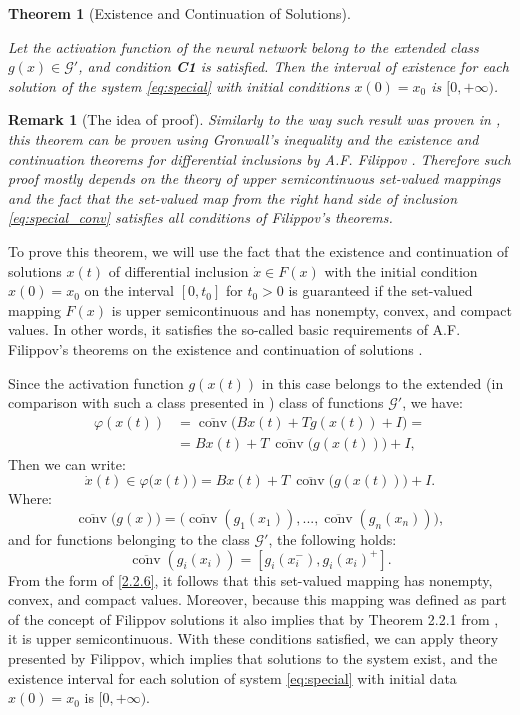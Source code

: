 \documentclass[journal]{IEEEtran}
\newtheorem{theorem}{Theorem}
\newtheorem{remark}{Remark}
\begin{document}
\begin{theorem}[Existence and Continuation of Solutions]\label{max_int}

Let the activation function of the neural network belong to the extended class $g(x)\in \mathcal{G'}$, and condition \textbf{C1} is satisfied. Then the interval of existence for each solution of the system \eqref{eq:special} with initial conditions $x(0) = x_0$ is $[0, +\infty)$.

\end{theorem}

\begin{remark} [The idea of proof]
Similarly to the way such result was proven in \cite{eq_ref_11, GAS_of_delayed, GAS_discrete_time_varying}, this theorem can be proven using Gronwall’s inequality and the existence and continuation theorems for differential inclusions by A.F. Filippov \cite{p2}. Therefore such proof mostly depends on the theory of upper semicontinuous set-valued mappings and the fact that the set-valued map from the right hand side of inclusion \eqref{eq:special_conv} satisfies all conditions of Filippov's theorems.
\end{remark}
\begin{IEEEproof}
To prove this theorem, we will use the fact that the existence and continuation of solutions \( x(t) \) of differential inclusion \( \dot{x} \in F(x) \) with the initial condition \( x(0) = x_0 \) on the interval \([0, t_0]\) for \( t_0 > 0 \) is guaranteed if the set-valued mapping \( F(x) \) is upper semicontinuous and has nonempty, convex, and compact values. In other words, it satisfies the so-called basic requirements of A.F. Filippov's theorems on the existence and continuation of solutions \cite[Theorems 1 and 2, pp. 77-78]{p2}. 

Since the activation function $g(x(t))$ in this case belongs to the extended (in comparison with such a class presented in \cite{p1}) class of functions
$\mathcal{G'}$, we have:
\[
\begin{aligned}
    \varphi(x(t)) &= \overline{\operatorname{conv}}\big(Bx(t) + T g(x(t)) + I\big) = \\
    &= Bx(t) + T ~\overline{\operatorname{conv}}\big(g(x(t))\big) + I,
\end{aligned}
\]
Then we can write:
\[
\dot{x}(t) \in \varphi\big(x(t)\big) = Bx(t) + T ~\overline{\operatorname{conv}}\big(g(x(t))\big) + I. \tag{+}\label{2.2.6}
\]
Where:
\[\overline{\operatorname{conv}}\big(g(x)\big) = \big(\overline{\operatorname{conv}}(g_1(x_1)), ..., \overline{\operatorname{conv}}(g_n(x_n))\big),
\]
and for functions belonging to the class $\mathcal{G'}$, the following holds:
\[
\overline{\operatorname{conv}}(g_i(x_i)) = [g_i(x_i^-), g_i(x_i)^+].
\]
From the form of \eqref{2.2.6}, it follows that this set-valued mapping has 
nonempty, convex, and compact values. Moreover, because this mapping was defined as part of the concept of Filippov solutions it also implies that  by Theorem 2.2.1 from \cite[p. 40]{p16}, it is upper semicontinuous. With these conditions satisfied, we can apply theory presented by Filippov, which implies that solutions to the system exist, and the existence interval for each  solution of system \eqref{eq:special} with initial data $x(0) = x_0$ is $[0, +\infty)$.
\end{IEEEproof}
\end{document}
